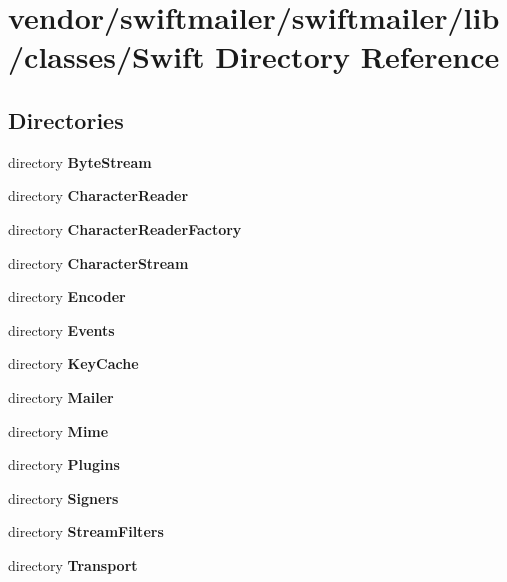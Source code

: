 \section{vendor/swiftmailer/swiftmailer/lib/classes/\+Swift Directory Reference}
\label{dir_502b9a1ef1b201701219c04e6331b5b4}
\subsection*{Directories}
\begin{DoxyCompactItemize}
\item 
directory {\bf Byte\+Stream}
\item 
directory {\bf Character\+Reader}
\item 
directory {\bf Character\+Reader\+Factory}
\item 
directory {\bf Character\+Stream}
\item 
directory {\bf Encoder}
\item 
directory {\bf Events}
\item 
directory {\bf Key\+Cache}
\item 
directory {\bf Mailer}
\item 
directory {\bf Mime}
\item 
directory {\bf Plugins}
\item 
directory {\bf Signers}
\item 
directory {\bf Stream\+Filters}
\item 
directory {\bf Transport}
\end{DoxyCompactItemize}
